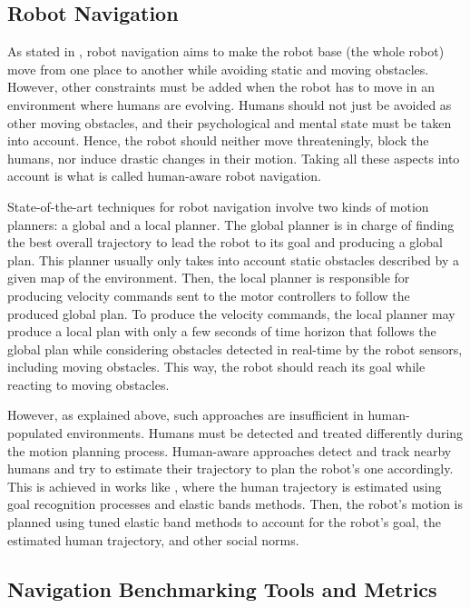 \subsection{Robot Navigation}

As stated in \cite{thesisBuisan21}, robot navigation aims to make the robot base (the whole robot) move from one place to another while avoiding static and moving obstacles. However, other constraints must be added when the robot has to move in an environment where humans are evolving. 
Humans should not just be avoided as other moving obstacles, and their psychological and mental state must be taken into account. Hence, the robot should neither move threateningly, block the humans, nor induce drastic changes in their motion. Taking all these aspects into account is what is called human-aware robot navigation.

State-of-the-art techniques for robot navigation involve two kinds of motion planners: a global and a local planner. The global planner is in charge of finding the best overall trajectory to lead the robot to its goal and producing a global plan. This planner usually only takes into account static obstacles described by a given map of the environment. Then, the local planner is responsible for producing velocity commands sent to the motor controllers to follow the produced global plan. To produce the velocity commands, the local planner may produce a local plan with only a few seconds of time horizon that follows the global plan while considering obstacles detected in real-time by the robot sensors, including moving obstacles. This way, the robot should reach its goal while reacting to moving obstacles. 

However, as explained above, such approaches are insufficient in human-populated environments. Humans must be detected and treated differently during the motion planning process. Human-aware approaches detect and track nearby humans and try to estimate their trajectory to plan the robot's one accordingly. This is achieved in works like \cite{singamaneni2021human}, where the human trajectory is estimated using goal recognition processes and elastic bands methods. Then, the robot's motion is planned using tuned elastic band methods to account for the robot's goal, the estimated human trajectory, and other social norms.   

\subsection{Navigation Benchmarking Tools and Metrics}


